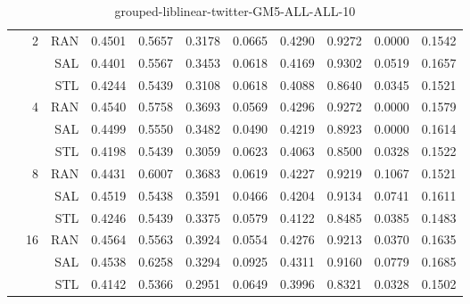 \begin{center}
\begin{table}[htbp]
\begin{tabular}{ | r | r | r | r | r | r | r | r | r | r | r |}
 & \multirow{3}{*}{2} & RAN & 0.4501 & 0.5657 & 0.3178 & 0.0665 & 0.4290 & 0.9272 & 0.0000 & 0.1542\\ \cline{3-11}
 &   & SAL & 0.4401 & 0.5567 & 0.3453 & 0.0618 & 0.4169 & 0.9302 & 0.0519 & 0.1657\\ \cline{3-11}
 &   & STL & 0.4244 & 0.5439 & 0.3108 & 0.0618 & 0.4088 & 0.8640 & 0.0345 & 0.1521\\ \cline{2-11}
 & \multirow{3}{*}{4} & RAN & 0.4540 & 0.5758 & 0.3693 & 0.0569 & 0.4296 & 0.9272 & 0.0000 & 0.1579\\ \cline{3-11}
 &   & SAL & 0.4499 & 0.5550 & 0.3482 & 0.0490 & 0.4219 & 0.8923 & 0.0000 & 0.1614\\ \cline{3-11}
 &   & STL & 0.4198 & 0.5439 & 0.3059 & 0.0623 & 0.4063 & 0.8500 & 0.0328 & 0.1522\\ \cline{2-11}
 & \multirow{3}{*}{8} & RAN & 0.4431 & 0.6007 & 0.3683 & 0.0619 & 0.4227 & 0.9219 & 0.1067 & 0.1521\\ \cline{3-11}
 &   & SAL & 0.4519 & 0.5438 & 0.3591 & 0.0466 & 0.4204 & 0.9134 & 0.0741 & 0.1611\\ \cline{3-11}
 &   & STL & 0.4246 & 0.5439 & 0.3375 & 0.0579 & 0.4122 & 0.8485 & 0.0385 & 0.1483\\ \cline{2-11}
 & \multirow{3}{*}{16} & RAN & 0.4564 & 0.5563 & 0.3924 & 0.0554 & 0.4276 & 0.9213 & 0.0370 & 0.1635\\ \cline{3-11}
 &   & SAL & 0.4538 & 0.6258 & 0.3294 & 0.0925 & 0.4311 & 0.9160 & 0.0779 & 0.1685\\ \cline{3-11}
 &   & STL & 0.4142 & 0.5366 & 0.2951 & 0.0649 & 0.3996 & 0.8321 & 0.0328 & 0.1502\\ \cline{2-11}
\hline
\end{tabular}
\caption{grouped-liblinear-twitter-GM5-ALL-ALL-10}
\end{table}
\end{center}

